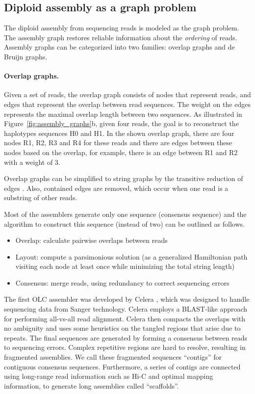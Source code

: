 \subsection{Diploid assembly as a graph problem}
The diploid assembly from sequencing reads is modeled as the graph problem.
The assembly graph restores reliable information about the \textit{ordering} of reads.
Assembly graphs can be categorized into two families: overlap graphs and de Bruijn graphs.
\paragraph{Overlap graphs.}
Given a set of reads, the overlap graph consists of nodes that represent reads, and edges that represent the overlap between read sequences.
The weight on the edges represents the maximal overlap length between two sequences. As illustrated in Figure~\ref{fig:assembly_graphs}b, 
given four reads, the goal is to reconstruct the haplotypes sequences H0 and H1.
In the shown overlap graph, there are four nodes R1, R2, R3 and R4 for these reads and there are edges between these nodes based on the overlap, for example, there is an edge between R1 and R2 with a weight of 3.

Overlap graphs can be simplified to string graphs by the transitive reduction of edges \citep{myers2005fragment}.
Also, contained edges \citep{myers2005fragment} are removed, which occur when one read is a substring of other reads.

Most of the assemblers generate only one sequence (consensus sequence) and the algorithm to construct this sequence (instead of two) can be outlined as follows.
\begin{itemize}
 \item Overlap: calculate pairwise overlaps between reads
 \item  Layout: compute a parsimonious solution (as a generalized Hamiltonian path visiting each node at least once while minimizing the total string length)
 \item  Consensus: merge reads, using redundancy to correct sequencing errors
\end{itemize}

The first OLC assembler was developed by Celera \citep{myers2000whole}, which was designed to handle sequencing data from Sanger technology.
Celera employs a BLAST-like approach for performing all-vs-all read alignment. 
Celera then compacts the overlaps with no ambiguity and uses some heuristics on the tangled regions that arise due to repeats. 
The final sequences
are generated by forming a consensus between reads to sequencing errors. Complex repetitive regions are hard to resolve, resulting in fragmented assemblies.  We call these fragmented sequences
``contigs'' for contiguous consensus sequences. Furthermore, a series of contigs are connected using long-range read information such as Hi-C and optimal mapping information, to generate long assemblies called ``scaffolds''.

